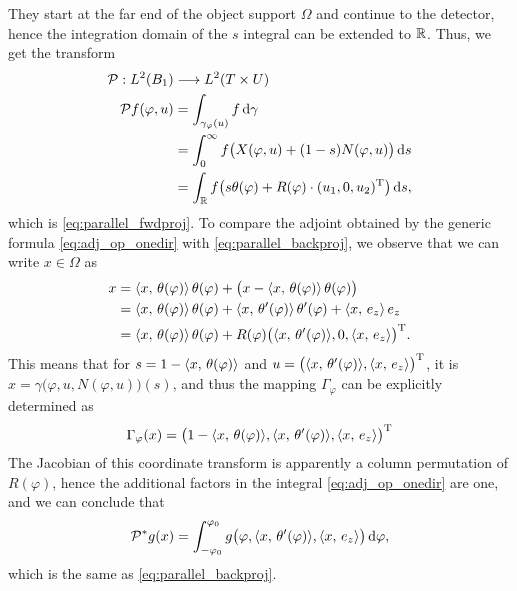 \documentclass{amsart}
\renewcommand*{\phi}{\varphi}
\begin{document}
\begin{example}
\begin{equation*}
 \end{equation*}
 They start at the far end of the object support $\Omega$ and continue to the detector, hence the integration domain of the $s$ 
 integral can be extended to ${\mathbb{R}}$. Thus, we get the transform
 \begin{align*}
  \OPP: L^2(B_1) & \Lto L^2(T \times U) \\
  \OPP f(\phi, u) 
  &= \int_{\gamma_\phi(u)} f\, \D \gamma \\
  &= \int_0^\infty f\big(X(\phi, u) + (1-s) N(\phi, u)\big)\, \D s \\
  &= \int_\RR f\big(s \theta(\phi) + R(\phi) \cdot \TRANSP{(u_1, 0, u_2)}\big)\, \D s,
 \end{align*}
 which is \eqref{eq:parallel_fwdproj}. To compare the adjoint obtained by the generic formula \eqref{eq:adj_op_onedir} with 
 \eqref{eq:parallel_backproj}, we observe that we can write $x \in \Omega$ as
 \begin{align*}
  x 
  &= \INNER{x}{\theta(\phi)}\, \theta(\phi) + \big(x - \INNER{x}{\theta(\phi)}\, \theta(\phi)\big) \\
  &= \INNER{x}{\theta(\phi)}\, \theta(\phi) + \INNER{x}{\theta'(\phi)}\, \theta'(\phi) + \INNER{x}{e_z}\, e_z \\
  &= \INNER{x}{\theta(\phi)}\, \theta(\phi) + R(\phi) \TRANSP{\big(\INNER{x}{\theta'(\phi)}, 0, \INNER{x}{e_z}\big)}.
 \end{align*}
 This means that for $s = 1 - \INNER{x}{\theta(\phi)}$ and $u = \TRANSP{\big(\INNER{x}{\theta'(\phi)}, \INNER{x}{e_z}\big)}$, it is 
 $x = \gamma\big(\phi, u, N(\phi, u)\big)(s)$, and thus the mapping $\Gamma_\phi$ can be explicitly determined as
 \begin{equation*}
  \Gamma_\phi(x) = \TRANSP{\big(1 - \INNER{x}{\theta(\phi)}, \INNER{x}{\theta'(\phi)}, \INNER{x}{e_z}\big)}
 \end{equation*}
 The Jacobian of this coordinate transform is apparently a column permutation of $R(\phi)$, hence the additional factors in the integral 
 \eqref{eq:adj_op_onedir} are one, and we can conclude that
 \begin{equation*}
  \DUALOPP g(x) = \int_{-\phi_0}^{\phi_0} g\big(\phi, \INNER{x}{\theta'(\phi)}, \INNER{x}{e_z}\big)\, \D\phi,
 \end{equation*}
 which is the same as \eqref{eq:parallel_backproj}.
\end{example}
\end{document}
